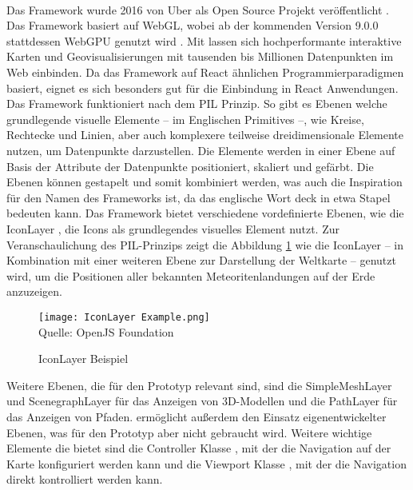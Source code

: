 \paragraph{\deckgl{}}
Das Framework \deckgl{} wurde 2016 von Uber als Open Source Projekt veröffentlicht \cite{Visgl}. Das Framework basiert auf \ac{WebGL}, wobei ab der kommenden Version 9.0.0 stattdessen WebGPU genutzt wird \cite{Green2022}. Mit \deckgl{} lassen sich hochperformante interaktive Karten und Geovisualisierungen mit tausenden bis Millionen Datenpunkten im Web einbinden. Da das Framework auf React ähnlichen Programmierparadigmen basiert, eignet es sich besonders gut für die Einbindung in React Anwendungen. Das Framework funktioniert nach dem \ac{PIL} Prinzip. So gibt es Ebenen welche grundlegende visuelle Elemente – im Englischen Primitives –, wie Kreise, Rechtecke und Linien, aber auch komplexere teilweise dreidimensionale Elemente nutzen, um Datenpunkte darzustellen. Die Elemente werden in einer Ebene auf Basis der Attribute der Datenpunkte positioniert, skaliert und gefärbt. Die Ebenen können gestapelt und somit kombiniert werden, was auch die Inspiration für den Namen des Frameworks ist, da das englische Wort deck in etwa Stapel bedeuten kann.\cite[S.~2]{YangWang2019} Das Framework bietet verschiedene vordefinierte Ebenen, wie die IconLayer \cite{DeckglIconLayer}, die Icons als grundlegendes visuelles Element nutzt. Zur Veranschaulichung des \ac{PIL}-Prinzips zeigt die Abbildung \ref{fig:IconLayerExample} wie die IconLayer – in Kombination mit einer weiteren Ebene zur Darstellung der Weltkarte – genutzt wird, um die Positionen aller bekannten Meteoritenlandungen auf der Erde anzuzeigen.

\begin{figure}[H]
    \caption{IconLayer Beispiel}\label{fig:IconLayerExample}
    \texttt{[image: IconLayer Example.png]}
    \\
    Quelle: OpenJS Foundation \cite{DeckGlMeteorites}
\end{figure}

Weitere Ebenen, die für den Prototyp relevant sind, sind die SimpleMeshLayer \cite{DeckglSimpleMeshLayer} und ScenegraphLayer \cite{DeckglScenegraphLayer} für das Anzeigen von 3D-Modellen und die PathLayer für das Anzeigen von Pfaden. \deckgl{} ermöglicht außerdem den Einsatz eigenentwickelter Ebenen, was für den Prototyp aber nicht gebraucht wird. Weitere wichtige Elemente die \deckgl{} bietet sind die Controller Klasse \cite{DeckglController}, mit der die Navigation auf der Karte konfiguriert werden kann und die Viewport Klasse \cite{DeckglViewport}, mit der die Navigation direkt kontrolliert werden kann.


